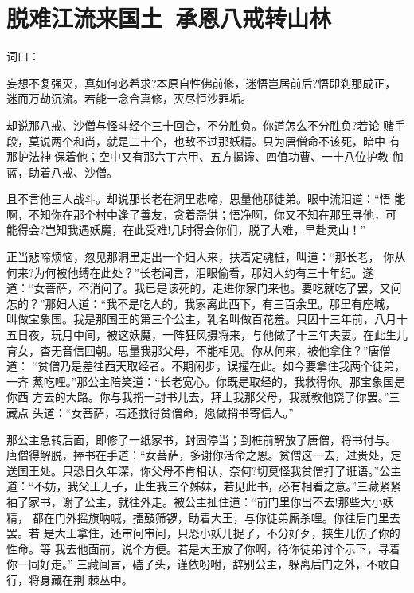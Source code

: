 \chapter{脱难江流来国土~承恩八戒转山林}

词曰：

妄想不复强灭，真如何必希求?本原自性佛前修，迷悟岂居前后?悟即刹那成正，
迷而万劫沉流。若能一念合真修，灭尽恒沙罪垢。

却说那八戒、沙僧与怪斗经个三十回合，不分胜负。你道怎么不分胜负?若论
赌手段，莫说两个和尚，就是二十个，也敌不过那妖精。只为唐僧命不该死，暗中
有那护法神保着他；空中又有那六丁六甲、五方揭谛、四值功曹、一十八位护教
伽蓝，助着八戒、沙僧。

且不言他三人战斗。却说那长老在洞里悲啼，思量他那徒弟。眼中流泪道：“悟
能啊，不知你在那个村中逢了善友，贪着斋供；悟净啊，你又不知在那里寻他，可
能得会?岂知我遇妖魔，在此受难!几时得会你们，脱了大难，早赴灵山！”

正当悲啼烦恼，忽见那洞里走出一个妇人来，扶着定魂桩，叫道：“那长老，
你从何来?为何被他缚在此处？”长老闻言，泪眼偷看，那妇人约有三十年纪。遂
道：“女菩萨，不消问了。我已是该死的，走进你家门来也。要吃就吃了罢，又问
怎的？”那妇人道：“我不是吃人的。我家离此西下，有三百余里。那里有座城，
叫做宝象国。我是那国王的第三个公主，乳名叫做百花羞。只因十三年前，八月十
五日夜，玩月中间，被这妖魔，一阵狂风摄将来，与他做了十三年夫妻。在此生儿
育女，杳无音信回朝。思量我那父母，不能相见。你从何来，被他拿住？”唐僧道：
“贫僧乃是差往西天取经者。不期闲步，误撞在此。如今要拿住我两个徒弟，一齐
蒸吃哩。”那公主陪笑道：“长老宽心。你既是取经的，我救得你。那宝象国是你西
方去的大路。你与我捎一封书儿去，拜上我那父母，我就教他饶了你罢。”三藏点
头道：“女菩萨，若还救得贫僧命，愿做捎书寄信人。”

那公主急转后面，即修了一纸家书，封固停当；到桩前解放了唐僧，将书付与。
唐僧得解脱，捧书在手道：“女菩萨，多谢你活命之恩。贫僧这一去，过贵处，定
送国王处。只恐日久年深，你父母不肯相认，奈何?切莫怪我贫僧打了诳语。”公主
道：“不妨，我父王无子，止生我三个姊妹，若见此书，必有相看之意。”三藏紧紧
袖了家书，谢了公主，就往外走。被公主扯住道：“前门里你出不去!那些大小妖精，
都在门外摇旗呐喊，擂鼓筛锣，助着大王，与你徒弟厮杀哩。你往后门里去罢。若
是大王拿住，还审问审问，只恐小妖儿捉了，不分好歹，挟生儿伤了你的性命。等
我去他面前，说个方便。若是大王放了你啊，待你徒弟讨个示下，寻着你一同好走。”
三藏闻言，磕了头，谨依吩咐，辞别公主，躲离后门之外，不敢自行，将身藏在荆
棘丛中。

